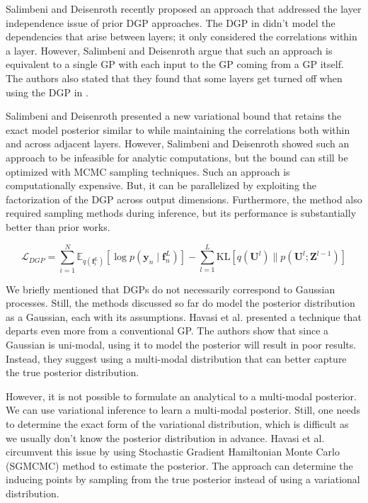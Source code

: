\documentclass[letterpaper,11pt]{extarticle}
\begin{document}
Salimbeni and Deisenroth \cite{SalimbeniD17} recently proposed an approach that addressed the layer independence issue of prior DGP approaches. The DGP in \cite{DamianouL13} didn't model the dependencies that arise between layers; it only considered the correlations within a layer. However, Salimbeni and Deisenroth argue that such an approach is equivalent to a single GP with each input to the GP coming from a GP itself. The authors also stated that they found that some layers get turned off when using the DGP in \cite{DamianouL13}. 

Salimbeni and Deisenroth \cite{SalimbeniD17} presented a new variational bound that retains the exact model posterior similar to \cite{DamianouL13} while maintaining the correlations both within and across adjacent layers. However, Salimbeni and Deisenroth showed such an approach to be infeasible for analytic computations, but the bound can still be optimized with MCMC sampling techniques. Such an approach is computationally expensive. But, it can be parallelized by exploiting the factorization of the DGP across output dimensions. Furthermore, the method also required sampling methods during inference, but its performance is substantially better than prior works.  

$$
\mathcal{L}_{D G P}=\sum_{i=1}^{N} \mathbb{E}_{q\left(\mathbf{f}_{i}^{L}\right)}\left[\log p\left(\mathbf{y}_{n} \mid \mathbf{f}_{n}^{L}\right)\right]-\sum_{l=1}^{L} \mathrm{KL}\left[q\left(\mathbf{U}^{l}\right) \| p\left(\mathbf{U}^{l} ; \mathbf{Z}^{l-1}\right)\right]
$$

We briefly mentioned that DGPs do not necessarily correspond to Gaussian processes. Still, the methods discussed so far do model the posterior distribution as a Gaussian, each with its assumptions. Havasi et al. \cite{HavasiLF18} presented a technique that departs even more from a conventional GP. The authors show that since a Gaussian is uni-modal, using it to model the posterior will result in poor results. Instead, they suggest using a multi-modal distribution that can better capture the true posterior distribution.  

However, it is not possible to formulate an analytical to a multi-modal posterior. We can use variational inference to learn a multi-modal posterior. Still, one needs to determine the exact form of the variational distribution, which is difficult as we usually don't know the posterior distribution in advance. Havasi et al. \cite{HavasiLF18} circumvent this issue by using Stochastic Gradient Hamiltonian Monte Carlo (SGMCMC) \cite{ChenFG14} method to estimate the posterior. The approach can determine the inducing points by sampling from the true posterior instead of using a variational distribution.  
\end{document}

